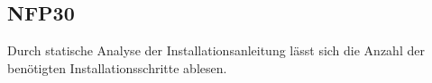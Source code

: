 \subsection*{NFP30}

Durch \gls{statische Analyse} der Installationsanleitung lässt sich die Anzahl der benötigten Installationsschritte ablesen.